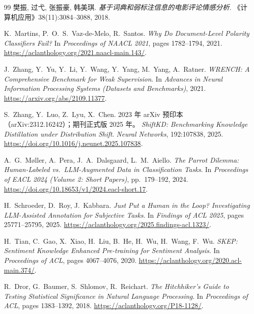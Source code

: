 \documentclass[11pt,a4paper]{article}
\begin{document}
\begin{thebibliography}{99}
樊振, 过弋, 张振豪, 韩美琪.
\newblock \emph{基于词典和弱标注信息的电影评论情感分析}.
\newblock 《计算机应用》38(11):3084--3088, 2018.

K.~Martins, P.~O.~S.~Vaz-de-Melo, R.~Santos.
\newblock \emph{Why Do Document-Level Polarity Classifiers Fail?}
\newblock In \emph{Proceedings of NAACL 2021}, pages 1782--1794, 2021.
\newblock \url{https://aclanthology.org/2021.naacl-main.143/}.

J.~Zhang, Y.~Yu, Y.~Li, Y.~Wang, Y.~Yang, M.~Yang, A.~Ratner.
\newblock \emph{WRENCH: A Comprehensive Benchmark for Weak Supervision}.
\newblock In \emph{Advances in Neural Information Processing Systems
(Datasets and Benchmarks)}, 2021.
\newblock \url{https://arxiv.org/abs/2109.11377}.

S.~Zhang, Y.~Luo, Z.~Lyu, X.~Chen. 2023 年 arXiv 预印本
（arXiv:2312.16242）；期刊正式版 2025 年。
\newblock \emph{ShiftKD: Benchmarking Knowledge Distillation under
Distribution Shift}.
\newblock \emph{Neural Networks}, 192:107838, 2025.
\newblock \url{https://doi.org/10.1016/j.neunet.2025.107838}.

A.~G.~M\o{}ller, A.~Pera, J.~A.~Dalsgaard, L.~M.~Aiello.
\newblock \emph{The Parrot Dilemma: Human-Labeled vs.\ LLM-Augmented Data
in Classification Tasks}.
\newblock In \emph{Proceedings of EACL 2024 (Volume 2: Short Papers)},
pp.~179--192, 2024.
\newblock \url{https://doi.org/10.18653/v1/2024.eacl-short.17}.

H.~Schroeder, D.~Roy, J.~Kabbara.
\newblock \emph{Just Put a Human in the Loop? Investigating LLM-Assisted
Annotation for Subjective Tasks}.
\newblock In \emph{Findings of ACL 2025}, pages 25771--25795, 2025.
\newblock \url{https://aclanthology.org/2025.findings-acl.1323/}.

H.~Tian, C.~Gao, X.~Xiao, H.~Liu, B.~He, H.~Wu, H.~Wang, F.~Wu.
\newblock \emph{SKEP: Sentiment Knowledge Enhanced Pre-training for Sentiment Analysis}.
\newblock In \emph{Proceedings of ACL}, pages 4067--4076, 2020.
\newblock \url{https://aclanthology.org/2020.acl-main.374/}.

R.~Dror, G.~Baumer, S.~Shlomov, R.~Reichart.
\newblock \emph{The Hitchhiker's Guide to Testing Statistical Significance in Natural Language Processing}.
\newblock In \emph{Proceedings of ACL}, pages 1383--1392, 2018.
\newblock \url{https://aclanthology.org/P18-1128/}.


\end{thebibliography}
\end{document}
